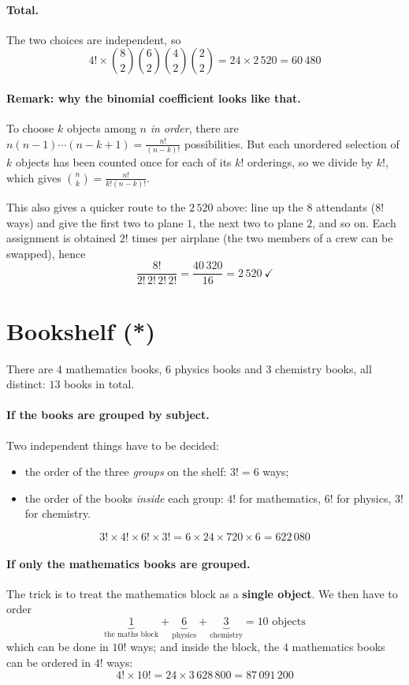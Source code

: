 \documentclass[]{article}
\begin{document}
	\paragraph{Total.}
	The two choices are independent, so
	$$
	4! \times \binom{8}{2}\binom{6}{2}\binom{4}{2}\binom{2}{2} = 24 \times 2\,520 = \boxed{60\,480}
	$$

	\paragraph{Remark: why the binomial coefficient looks like that.}
	To choose $k$ objects among $n$ \textit{in order}, there are $n (n-1) \cdots (n-k+1) = \frac{n!}{(n-k)!}$ possibilities.
	But each unordered selection of $k$ objects has been counted once for each of its $k!$ orderings, so we divide by $k!$, which gives $\binom{n}{k} = \frac{n!}{k!(n-k)!}$.

	This also gives a quicker route to the $2\,520$ above: line up the $8$ attendants ($8!$ ways) and give the first two to plane $1$, the next two to plane $2$, and so on.
	Each assignment is obtained $2!$ times per airplane (the two members of a crew can be swapped), hence
	$$
	\frac{8!}{2! \, 2! \, 2! \, 2!} = \frac{40\,320}{16} = 2\,520 \ \checkmark
	$$


	\section{Bookshelf (*)}

	There are $4$ mathematics books, $6$ physics books and $3$ chemistry books, all distinct: $13$ books in total.

	\paragraph{If the books are grouped by subject.}
	Two independent things have to be decided:
	\begin{itemize}
		\item the order of the three \textit{groups} on the shelf: $3! = 6$ ways;
		\item the order of the books \textit{inside} each group: $4!$ for mathematics, $6!$ for physics, $3!$ for chemistry.
	\end{itemize}
	$$
	3! \times 4! \times 6! \times 3! = 6 \times 24 \times 720 \times 6 = \boxed{622\,080}
	$$

	\paragraph{If only the mathematics books are grouped.}
	The trick is to treat the mathematics block as a \textbf{single object}.
	We then have to order
	$$
	\underbrace{1}_{\text{the maths block}} + \underbrace{6}_{\text{physics}} + \underbrace{3}_{\text{chemistry}} = 10 \text{ objects}
	$$
	which can be done in $10!$ ways; and inside the block, the $4$ mathematics books can be ordered in $4!$ ways:
	$$
	4! \times 10! = 24 \times 3\,628\,800 = \boxed{87\,091\,200}
	$$
\end{document}
